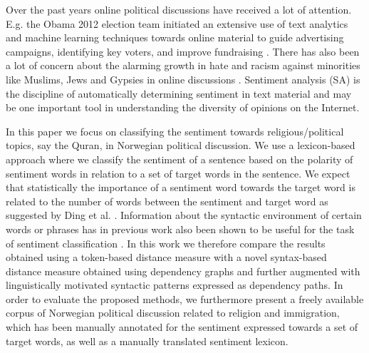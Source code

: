 \documentclass[11pt]{article}
\begin{document}

Over the past years online political discussions have received a lot of attention. E.g. the Obama 2012 election team initiated an extensive use of text analytics and machine learning techniques towards online material to guide advertising campaigns, identifying key voters, and improve fundraising \cite{Issenberg12}. There has also been a lot of concern about the alarming growth in hate and racism against minorities like Muslims, Jews and Gypsies in online discussions \cite{r6,s2}. Sentiment analysis (SA) is the discipline of automatically determining sentiment in text material and may be one important tool in understanding the diversity of opinions on the Internet. 


In this paper we focus on classifying the sentiment towards
religious/political topics, say the Quran, in Norwegian political
discussion. We use a lexicon-based approach where we classify the
sentiment of a sentence based on the polarity of sentiment words in
relation to a set of target words in the sentence. We expect that
statistically the importance of a sentiment word towards the target
word is related to the number of words between the sentiment and
target word as suggested by Ding et al. .
Information about the syntactic environment of certain words or
phrases has in previous work also been shown to be useful for the task
of sentiment classification \cite{Wil:Wie:Hof:09,Jiang11}. In this
work we therefore compare the results obtained using a token-based
distance measure with a novel syntax-based distance measure obtained
using dependency graphs and further augmented with linguistically
motivated syntactic patterns expressed as dependency paths. In order
to evaluate the proposed methods, we furthermore present a freely
available corpus of Norwegian political discussion related to religion
and immigration, which has been manually annotated for the sentiment
expressed towards a set of target words, as well as a manually
translated sentiment lexicon.
\end{document}
